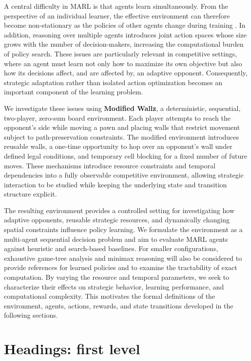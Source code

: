 \documentclass{article}
\begin{document}
A central difficulty in MARL is that agents learn simultaneously. From the perspective of an individual learner, the effective environment can therefore become non-stationary as the policies of other agents change during training \cite{gronauer2022multiagent,zhang2020multiagent}. In addition, reasoning over multiple agents introduces joint action spaces whose size grows with the number of decision-makers, increasing the computational burden of policy search. These issues are particularly relevant in competitive settings, where an agent must learn not only how to maximize its own objective but also how its decisions affect, and are affected by, an adaptive opponent. Consequently, strategic adaptation rather than isolated action optimization becomes an important component of the learning problem.

We investigate these issues using \textbf{Modified Wallz}, a deterministic, sequential, two-player, zero-sum board environment. Each player attempts to reach the opponent's side while moving a pawn and placing walls that restrict movement subject to path-preservation constraints. The modified environment introduces reusable walls, a one-time opportunity to hop over an opponent's wall under defined legal conditions, and temporary cell blocking for a fixed number of future moves. These mechanisms introduce resource constraints and temporal dependencies into a fully observable competitive environment, allowing strategic interaction to be studied while keeping the underlying state and transition structure explicit.

The resulting environment provides a controlled setting for investigating how adaptive opponents, reusable strategic resources, and dynamically changing spatial constraints influence policy learning. We formulate the environment as a multi-agent sequential decision problem and aim to evaluate MARL agents against heuristic and search-based baselines. For smaller configurations, exhaustive game-tree analysis and minimax reasoning will also be considered to provide references for learned policies and to examine the tractability of exact computation. By varying the resource and temporal parameters, we seek to characterize their effects on strategic behavior, learning performance, and computational complexity. This motivates the formal definitions of the environment, agents, actions, rewards, and state transitions developed in the following sections.


\section{Headings: first level}
\label{sec:headings}
\end{document}
